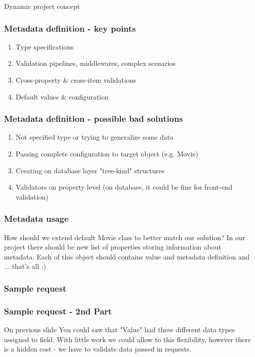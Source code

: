 \documentclass{beamer}
\begin{document}
\begin{section}{Dynamic project concept}
\begin{frame}
\end{frame}

\begin{frame}
\frametitle{Metadata definition - key points}

\begin{enumerate}
	\item Type specifications
	\item Validation pipelines, middlewares, complex scenarios
	\item Cross-property \& cross-item validations
	\item Default values \& configuration
\end{enumerate}

\end{frame}

\begin{frame}
\frametitle{Metadata definition - possible bad solutions}

\begin{enumerate}
	\item Not specified type or trying to generalize some data
	\item Passing complete configuration to target object (e.g. Movie)
	\item Creating on database layer "tree-kind" structures
	\item Validators on property level (on database, it could be fine for front-end validation)
\end{enumerate}

\end{frame}

\begin{frame}
\frametitle{Metadata usage}
How should we extend default Movie class to better match our solution? \newline \newline \pause  In our project there should be new list of properties storing information about metadata. Each of this object should contains value and metadata definition and ... \pause that's all :)
\end{frame}

\begin{frame}
\frametitle{Sample request}



\end{frame}

\begin{frame}
\frametitle{Sample request - 2nd Part }
On previous slide You could saw that "Value"  had three different data types assigned to field. With little work we could allow to this flexibility, however there is a hidden cost - we have to validate data passed in requests.


\end{frame}
\end{section}
\end{document}
